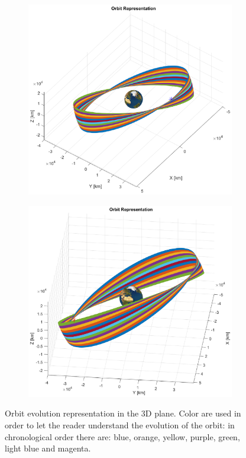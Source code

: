 \documentclass{article}
\begin{document}
\begin{figure}[H]
	\centering
	\begin{subfigure}[b]{0.5\textwidth}
		\includegraphics[width=\textwidth]{evolutionorbit2.eps}
		\caption{}
		\label{fig:1a}
	\end{subfigure}%
	\begin{subfigure}[b]{0.5\textwidth}
		\includegraphics[width=\textwidth]{evolutionorbit3.eps}
		\caption{}
		\label{fig:1b}
	\end{subfigure}
	\caption{Orbit evolution representation in the 3D plane. Color are used in order to let the reader understand the evolution of the orbit: in chronological order there are: blue, orange, yellow, purple, green, light blue and magenta.
	}
\end{figure}
\end{document}
